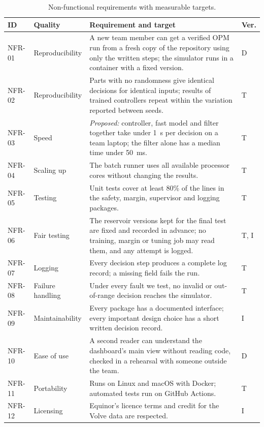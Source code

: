 \documentclass[11pt,letterpaper]{article}
\begin{document}
\begin{table}[H]
\caption{Non-functional requirements with measurable targets.}\label{tab:nfr}
\small
\begin{tabularx}{\textwidth}{@{}P{1.35cm}P{2.3cm}LP{0.7cm}@{}}
\toprule
\textbf{ID} & \textbf{Quality} & \textbf{Requirement and target} & \textbf{Ver.} \\
\midrule
NFR-01 & Reproducibility & A new team member can get a verified OPM run from a fresh copy of the repository using only the written steps; the simulator runs in a container with a fixed version. & D \\
NFR-02 & Reproducibility & Parts with no randomness give identical decisions for identical inputs; results of trained controllers repeat within the variation reported between seeds. & T \\
NFR-03 & Speed & \emph{Proposed:} controller, fast model and filter together take under \SI{1}{\second} per decision on a team laptop; the filter alone has a median time under \SI{50}{\milli\second}. & T \\
NFR-04 & Scaling up & The batch runner uses all available processor cores without changing the results. & T \\
NFR-05 & Testing & Unit tests cover at least 80\% of the lines in the safety, margin, supervisor and logging packages. & T \\
NFR-06 & Fair testing & The reservoir versions kept for the final test are fixed and recorded in advance; no training, margin or tuning job may read them, and any attempt is logged. & T, I \\
NFR-07 & Logging & Every decision step produces a complete log record; a missing field fails the run. & T \\
NFR-08 & Failure handling & Under every fault we test, no invalid or out-of-range decision reaches the simulator. & T \\
NFR-09 & Maintainability & Every package has a documented interface; every important design choice has a short written decision record. & I \\
NFR-10 & Ease of use & A second reader can understand the dashboard's main view without reading code, checked in a rehearsal with someone outside the team. & D \\
NFR-11 & Portability & Runs on Linux and macOS with Docker; automated tests run on GitHub Actions. & T \\
NFR-12 & Licensing & Equinor's licence terms and credit for the Volve data are respected. & I \\
\bottomrule
\end{tabularx}
\end{table}
\end{document}
